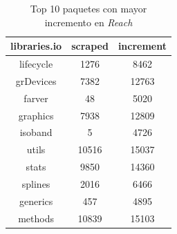\begin{table}
    \begin{center}
        \begin{tabular}{|c|c|c|}
            \hline
            \textbf{libraries.io} & \textbf{scraped} & \textbf{increment} \\
            \hline
            lifecycle             & 1276             & 8462               \\
            grDevices             & 7382             & 12763              \\
            farver                & 48               & 5020               \\
            graphics              & 7938             & 12809              \\
            isoband               & 5                & 4726               \\
            utils                 & 10516            & 15037              \\
            stats                 & 9850             & 14360              \\
            splines               & 2016             & 6466               \\
            generics              & 457              & 4895               \\
            methods               & 10839            & 15103              \\
            \hline
        \end{tabular}
        \caption{Top 10 paquetes con mayor incremento en \textit{Reach}}
        \label{tab:Top 10 paquetes con mayor incremento en Reach}
    \end{center}
\end{table}


